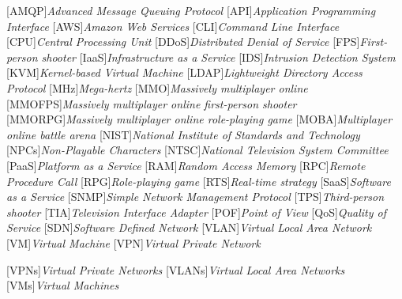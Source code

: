 \begin{acronym}[]
	[AMQP]{{\it Advanced Message Queuing Protocol}}
	[API]{{\it Application Programming Interface}}
  [AWS]{{\it Amazon Web Services}}
	[CLI]{{\it Command Line Interface}}
	[CPU]{{\it Central Processing Unit}}
	[DDoS]{{\it Distributed Denial of Service}}
	[FPS]{{\it First-person shooter}}
	[IaaS]{{\it Infrastructure as a Service}}
  [IDS]{{\it Intrusion Detection System}}
	[KVM]{{\it Kernel-based Virtual Machine}}
  [LDAP]{{\it Lightweight Directory Access Protocol}}
	[MHz]{{\it Mega-hertz}}
	[MMO]{{\it Massively multiplayer online}}
	[MMOFPS]{{\it Massively multiplayer online first-person shooter}}
	[MMORPG]{{\it Massively multiplayer online role-playing game}}
	[MOBA]{{\it Multiplayer online battle arena}}
	[NIST]{{\it National Institute of Standards and Technology}}
	[NPCs]{{\it Non-Playable Characters}}
	[NTSC]{{\it National Television System Committee}}
	[PaaS]{{\it Platform as a Service}}
	[RAM]{{\it Random Access Memory}}
  [RPC]{{\it Remote Procedure Call}}
	[RPG]{{\it Role-playing game}}
	[RTS]{{\it Real-time strategy}}
	[SaaS]{{\it Software as a Service}}
	[SNMP]{{\it Simple Network Management Protocol}}
	[TPS]{{\it Third-person shooter}}
	[TIA]{{\it Television Interface Adapter}}
	[POF]{{\it Point of View}}
	[QoS]{{\it Quality of Service}}
	[SDN]{{\it Software Defined Network}}
	[VLAN]{{\it Virtual Local Area Network}}
	[VM]{{\it Virtual Machine}}
	[VPN]{{\it Virtual Private Network}}



	[VPNs]{{\it Virtual Private Networks}}
	[VLANs]{{\it Virtual Local Area Networks}}
	[VMs]{{\it Virtual Machines}}
\end{acronym}


